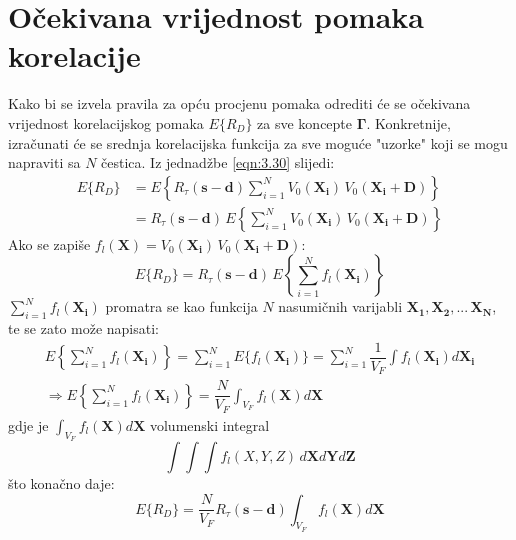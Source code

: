 \section{Očekivana vrijednost pomaka korelacije}
Kako bi se izvela pravila za opću procjenu pomaka odrediti će se očekivana vrijednost korelacijskog pomaka $E\{R_{D}\}$ za sve koncepte $\boldsymbol{\Gamma}$. Konkretnije, izračunati će se srednja korelacijska funkcija za sve moguće "uzorke" koji se mogu napraviti sa $N$ čestica. Iz jednadžbe \ref{eqn:3.30} slijedi:
\begin{equation}
	\begin{split}
		E\{R_{D}\} &= E\left\{R_{\tau}(\boldsymbol{s}-\boldsymbol{d})\sum_{i=1}^{N}V_{0}(\boldsymbol{X_{i}})\, V_{0}(\boldsymbol{X_{i}}+\boldsymbol{D})\right\}\\
		&=R_{\tau}(\boldsymbol{s}-\boldsymbol{d})\, E\left\{ \sum_{i=1}^{N}V_{0}(\boldsymbol{X_{i}})\, V_{0}(\boldsymbol{X_{i}}+\boldsymbol{D})\right\}
	\end{split}
	\label{eqn:3.31}
\end{equation}
Ako se zapiše $f_{l}(\boldsymbol{X})=V_{0}(\boldsymbol{X_{i}})\, V_{0}(\boldsymbol{X_{i}}+\boldsymbol{D})$:
\begin{equation*}
	E\{R_{D}\} = R_{\tau}(\boldsymbol{s}-\boldsymbol{d})\, E\left\{\sum_{i=1}^{N}f_{l}(\boldsymbol{X_{i}})\right\}
\end{equation*}
$\sum_{i=1}^{N}f_{l}(\boldsymbol{X_{i}})$ promatra se kao funkcija $N$ nasumičnih varijabli $\boldsymbol{X_{1}}, \boldsymbol{X_{2}},...\, \boldsymbol{X_{N}}$, te se zato može napisati:
\begin{equation}
	\begin{split}
		E\left\{\sum_{i=1}^{N}f_{l}(\boldsymbol{X_{i}})\right\} = \sum_{i=1}^{N}E\{f_{l}(\boldsymbol{X_{i}})\} = \sum_{i=1}^{N}\dfrac{1}{V_{F}}\int f_{l}(\boldsymbol{X_{i}})d\boldsymbol{X_{i}}\\
		\Rightarrow E\left\{\sum_{i=1}^{N}f_{l}(\boldsymbol{X_{i}})\right\} = \dfrac{N}{V_{F}}\int_{V_{F}}f_{l}(\boldsymbol{X})d\boldsymbol{X}
	\end{split}
	\label{eqn:3.32}
\end{equation}
gdje je $\int_{V_{F}} f_{l}(\boldsymbol{X})d\boldsymbol{X}$ volumenski integral
\begin{equation*}
	\int \int \int f_{l}(X, Y, Z)\, d\boldsymbol{X}d\boldsymbol{Y}d\boldsymbol{Z}
\end{equation*}
što konačno daje:
\begin{equation}
	E\{R_{D}\}= \dfrac{N}{V_{F}}R_{\tau}(\boldsymbol{s}-\boldsymbol{d})\int_{V_{F}}f_{l}(\boldsymbol{X})d\boldsymbol{X}
	\label{eqn:3.33}
\end{equation}
